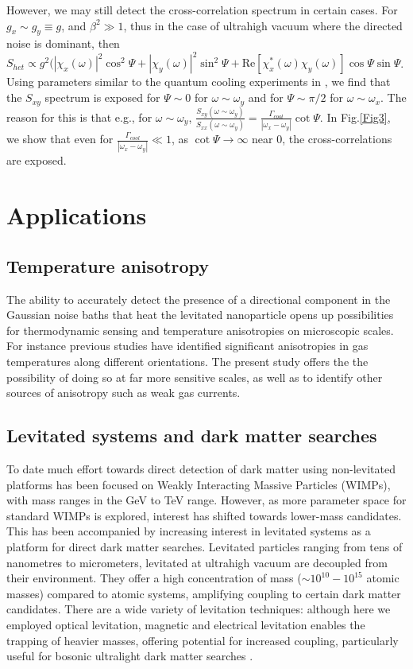 \documentclass[twocolumn,english,notitlepage,superscriptaddress,nofootinbib]{revtex4-2}
\begin{document}
However,  we may still detect the cross-correlation spectrum  in certain  cases.  For $g_x\sim g_y \equiv g$,  and $\beta^2\gg 1 $,  thus in the case of ultrahigh vacuum where the directed noise is dominant,  then 
$S_{het} \propto g^2(|\chi_x(\omega)|^2 \cos^2 \Psi + |\chi_y(\omega)|^2 \sin^2 \Psi  +  \text{Re}[\chi_x^*(\omega) \chi_y(\omega)] \cos \Psi \sin \Psi$.   Using parameters similar to the quantum cooling experiments in  \cite{Novotny2023},
we find that the $S_{xy}$ spectrum is exposed for $\Psi \sim 0$ for $\omega \sim  \omega_y$ and for $\Psi \sim \pi/2$ for $\omega\sim \omega_x$.  The reason for this is that e.g.,  for $\omega\sim \omega_y$,
$\frac{S_{xy}(\omega\sim \omega_y)}{S_{xx}(\omega\sim \omega_y)}= \frac{\Gamma_{cool}}{ |\omega_x-\omega_y|} \cot \Psi$.  In Fig.\ref{Fig3},  we show that even for $\frac{\Gamma_{cool}}{ |\omega_x-\omega_y|}\ll1$,
as $\cot \Psi \to \infty$ near 0, the cross-correlations are exposed.
\section{Applications}
\subsection{Temperature anisotropy}
The ability to accurately detect the presence of a directional component in the Gaussian noise baths that heat the levitated nanoparticle
opens up possibilities for thermodynamic sensing and temperature anisotropies on microscopic scales. For instance previous studies
\cite{Millen2014} have identified significant anisotropies in gas temperatures along different orientations. The present study offers the
the possibility of doing so at far more sensitive scales, as well as to identify other sources of anisotropy such as weak gas currents.


\subsection{Levitated systems and dark matter searches}

To date much  effort towards direct detection of dark matter using non-levitated platforms has been focused on Weakly Interacting Massive Particles (WIMPs), with mass ranges in the GeV to TeV range.  However,  as more parameter space for standard WIMPs is explored,  interest has  shifted towards  lower-mass candidates.  This has been accompanied by increasing interest in levitated systems as a platform for direct dark matter searches.  Levitated particles ranging from tens of nanometres to micrometers, levitated at ultrahigh vacuum  are decoupled from their environment.  They offer a high concentration of mass ($\sim 10^{10} - 10^{15}$ atomic masses) compared to atomic systems,   amplifying coupling to certain dark matter candidates.  There are a wide variety of levitation techniques:   although here we employed optical levitation,  magnetic and electrical levitation enables the trapping of heavier masses, offering potential for increased coupling,  particularly useful for bosonic ultralight dark matter searches 
\cite{DuDM2023}.  
\end{document}
